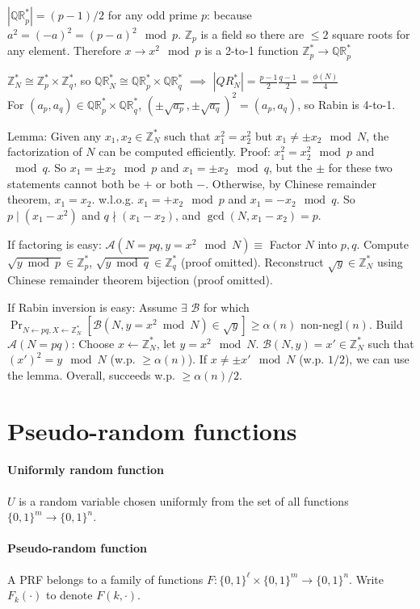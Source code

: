\documentclass[11pt]{article}
\newcommand{\eqdef}{\ensuremath{\equiv}}
\newcommand{\abs}[1]{{\ensuremath{\left\vert#1\right\vert}}}
\newcommand{\ZZ}{\ensuremath{\mathds{Z}}}
\newcommand{\QR}{\ensuremath{\mathds{QR}}}
\newcommand{\divides}{\mid}
\newcommand{\negl}{\text{negl}}
\newcommand{\AAA}{\ensuremath{\mathcal{A}}}
\newcommand{\BBB}{\ensuremath{\mathcal{B}}}
\theoremstyle{remark}
\begin{document}
$\abs{\QR_p^*}=(p-1)/2$ for any odd prime $p$:
because $a^2 = (-a)^2 = (p-a)^2 \mod p$.
$\ZZ_p$ is a field so there are $\le 2$ square roots for any element.
Therefore $x \rightarrow x^2 \mod p$ is a 2-to-1 function $\ZZ_p^* \rightarrow \QR_p^*$

$\ZZ_N^* \cong \ZZ_p^* \times \ZZ_q^*$, so $\QR_N^* \cong \QR_p^* \times \QR_q^*$
$\implies$ $\abs{QR_N^*} = \frac{p-1}{2}\frac{q-1}{2} = \frac{\phi(N)}{4}$ \\
For $(a_p, a_q) \in \QR_p^*\times\QR_q^*$, $(\pm\sqrt{a_p},\pm\sqrt{a_q})^2 = (a_p,a_q)$,
so Rabin is 4-to-1.

Lemma: Given any $x_1, x_2 \in \ZZ_N^*$ such that $x_1^2 = x_2^2$ but $x_1 \neq \pm x_2 \mod N$,
the factorization of $N$ can be computed efficiently.
Proof: $x_1^2 = x_2^2 \mod p$ and $\mod q$.
So $x_1=\pm x_2 \mod p$ and $x_1=\pm x_2 \mod q$, but the $\pm$ for these
two statements cannot both be $+$ or both $-$.
Otherwise, by Chinese remainder theorem, $x_1 = x_2$.
w.l.o.g. $x_1 = +x_2 \mod p$ and $x_1 = -x_2 \mod q$.
So $p \divides (x_1-x^2)$ and $q\nmid(x_1-x_2)$,
and $\gcd(N, x_1-x_2) = p$.

If factoring is easy: $\AAA(N=pq, y=x^2\mod N)\eqdef$
Factor $N$ into $p,q$.
Compute $\sqrt{y\bmod p}\in\ZZ_p^*$, $\sqrt{y\bmod q}\in\ZZ_q^*$ (proof omitted).
Reconstruct $\sqrt{y}\in\ZZ_N^*$ using Chinese remainder theorem bijection (proof omitted).

If Rabin inversion is easy:
Assume $\exists$ $\BBB$ for which
$\Pr_{N\gets pq,X\gets\ZZ_N^*}[\BBB(N, y=x^2\bmod N)\in\sqrt{y}] \ge \alpha(n)$ non-$\negl(n)$.
Build $\AAA(N=pq)$: Choose $x\gets\ZZ_N^*$, let $y=x^2\mod N$.
$\BBB(N, y) = x' \in \ZZ_N^*$ such that $(x')^2 = y \mod N$ (w.p. $\ge\alpha(n)$).
If $x \neq \pm x' \mod N$ (w.p. $1/2$), we can use the lemma.
Overall, succeeds w.p. $\ge \alpha(n)/2$.

\section{Pseudo-random functions}

\paragraph{Uniformly random function}
$U$ is a random variable chosen uniformly from the set of all functions
$\{0,1\}^m \rightarrow \{0,1\}^n$.

\paragraph{Pseudo-random function}
A PRF belongs to a family of functions
$F : \{0,1\}^\ell \times \{0,1\}^m \rightarrow \{0,1\}^n$.
Write $F_k(\cdot)$ to denote $F(k, \cdot)$.
\end{document}
